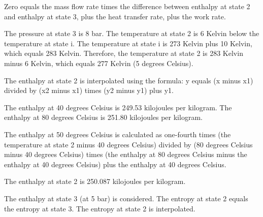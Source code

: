 Zero equals the mass flow rate times the difference between enthalpy at state 2 and enthalpy at state 3, plus the heat transfer rate, plus the work rate.

The pressure at state 3 is 8 bar.
The temperature at state 2 is 6 Kelvin below the temperature at state i.
The temperature at state i is 273 Kelvin plus 10 Kelvin, which equals 283 Kelvin.
Therefore, the temperature at state 2 is 283 Kelvin minus 6 Kelvin, which equals 277 Kelvin (5 degrees Celsius).

The enthalpy at state 2 is interpolated using the formula: y equals (x minus x1) divided by (x2 minus x1) times (y2 minus y1) plus y1.

The enthalpy at 40 degrees Celsius is 249.53 kilojoules per kilogram.
The enthalpy at 80 degrees Celsius is 251.80 kilojoules per kilogram.

The enthalpy at 50 degrees Celsius is calculated as one-fourth times (the temperature at state 2 minus 40 degrees Celsius) divided by (80 degrees Celsius minus 40 degrees Celsius) times (the enthalpy at 80 degrees Celsius minus the enthalpy at 40 degrees Celsius) plus the enthalpy at 40 degrees Celsius.

The enthalpy at state 2 is 250.087 kilojoules per kilogram.

The enthalpy at state 3 (at 5 bar) is considered.
The entropy at state 2 equals the entropy at state 3.
The entropy at state 2 is interpolated.